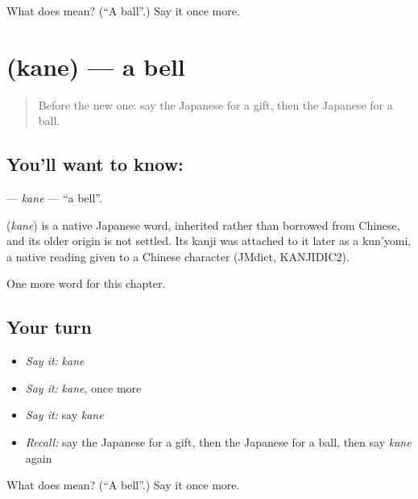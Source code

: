 \begin{tcolorbox}[breakable,colback=teal!4,colframe=teal!35!black,title={Before you move on}]
What does  mean? (\textquotedblleft{}A ball\textquotedblright{}.) Say it once more.
\end{tcolorbox}
\section[\texorpdfstring{\ja{かね} (kane)}{かね (kane)}]{ (kane) — a bell}

\label{lesson:JA-C104-kane}



\begin{quote}
Before the new one: say the Japanese for a gift, then the Japanese for a ball.
\end{quote}

\subsection*{You'll want to know: }
\textbf{} — \emph{kane} — \textquotedblleft{}a bell\textquotedblright{}.

\begin{cousinweb}
\textbf{} (\emph{kane}) is a native Japanese word, inherited rather than borrowed from Chinese, and its older origin is not settled. Its kanji was attached to it later as a kun'yomi, a native reading given to a Chinese character (JMdict, KANJIDIC2).
\end{cousinweb}

\begin{grammarlens}[title={What you've built}]
One more word for this chapter.
\end{grammarlens}

\subsection*{Your turn}
\begin{itemize}
\raggedright
  \item \emph{Say it:} \emph{kane}
  \item \emph{Say it:} \emph{kane}, once more
  \item \emph{Say it:} say \emph{kane}
  \item \emph{Recall:} say the Japanese for a gift, then the Japanese for a ball, then say \emph{kane} again
\end{itemize}

\begin{tcolorbox}[breakable,colback=teal!4,colframe=teal!35!black,title={Before you move on}]
What does  mean? (\textquotedblleft{}A bell\textquotedblright{}.) Say it once more.
\end{tcolorbox}
